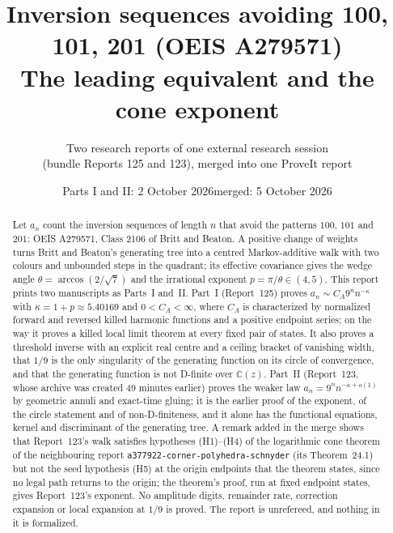 \documentclass[11pt,letterpaper]{article}
\title{\textbf{Inversion sequences avoiding 100, 101, 201 (OEIS A279571)}\\[7pt]
\large The leading equivalent and the cone exponent}
\author{Two research reports of one external research session\\(bundle Reports 125 and 123), merged into one ProveIt report}
\date{Parts I and II: 2 October 2026\quad merged: 5 October 2026}
\theoremstyle{remark}\newtheorem{remark}[theorem]{Remark}
\newcommand{\1}{\mathbf1}
\newcommand{\file}[1]{\textup{\nolinkurl{#1}}}
\begin{document}
\hypersetup{pageanchor=false}
\maketitle
\begin{abstract}
Let $a_n$ count the inversion sequences of length $n$ that avoid the patterns $100$, $101$ and $201$: OEIS A279571, Class 2106 of Britt and Beaton. A positive change of weights turns Britt and Beaton's generating tree into a centred Markov-additive walk with two colours and unbounded steps in the quadrant; its effective covariance gives the wedge angle $\theta=\arccos(2/\sqrt7)$ and the irrational exponent $p=\pi/\theta\in(4,5)$. This report prints two manuscripts as Parts~I and~II. Part~I (Report~125) proves
$a_n\sim C_A9^nn^{-\kappa}$ with $\kappa=1+p\approx5.40169$ and $0<C_A<\infty$, where $C_A$ is characterized by normalized forward and reversed killed harmonic functions and a positive endpoint series; on the way it proves a killed local limit theorem at every fixed pair of states. It also proves a threshold inverse with an explicit real centre and a ceiling bracket of vanishing width, that $1/9$ is the only singularity of the generating function on its circle of convergence, and that the generating function is not D-finite over $\mathbb C(z)$. Part~II (Report~123, whose archive was created 49 minutes earlier) proves the weaker law $a_n=9^nn^{-\kappa+o(1)}$ by geometric annuli and exact-time gluing; it is the earlier proof of the exponent, of the circle statement and of non-D-finiteness, and it alone has the functional equations, kernel and discriminant of the generating tree. A remark added in the merge shows that Report~123's walk satisfies hypotheses (H1)--(H4) of the logarithmic cone theorem of the neighbouring report \file{a377922-corner-polyhedra-schnyder} (its Theorem~24.1) but not the seed hypothesis (H5) at the origin endpoints that the theorem states, since no legal path returns to the origin; the theorem's proof, run at fixed endpoint states, gives Report~123's exponent. No amplitude digits, remainder rate, correction expansion or local expansion at $1/9$ is proved. The report is unrefereed, and nothing in it is formalized.
\end{abstract}
\hypersetup{pageanchor=true}
\setcounter{tocdepth}{1}
{\small\setlength{\parskip}{0pt}\tableofcontents}
\newpage
\end{document}
